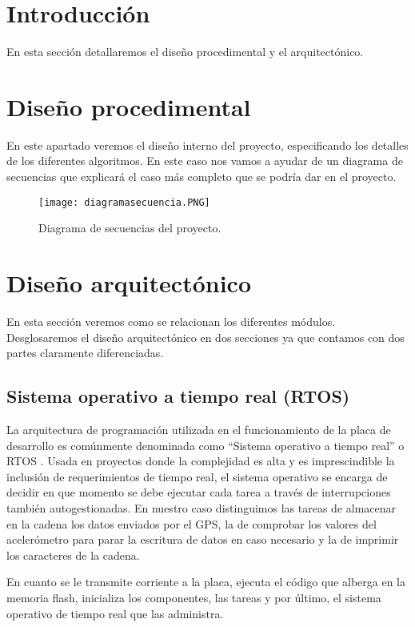 
\section{Introducción}
En esta sección detallaremos el diseño procedimental y el arquitectónico.

\section{Diseño procedimental}
En este apartado veremos el diseño interno del proyecto, especificando los detalles de los diferentes algoritmos. En este caso nos vamos a ayudar de un diagrama de secuencias que explicará el caso más completo que se podría dar en el proyecto.
\begin{figure}[!h]
	\centering
	\texttt{[image: diagramasecuencia.PNG]}
	\caption{Diagrama de secuencias del proyecto.}\label{fig:diagramasecuencia.PNG}
\end{figure}
\FloatBarrier

\section{Diseño arquitectónico}
En esta sección veremos como se relacionan los diferentes módulos. Desglosaremos el diseño arquitectónico en dos secciones ya que contamos con dos partes claramente diferenciadas.

\subsection{Sistema operativo a tiempo real (RTOS)}
La arquitectura de programación utilizada en el funcionamiento de la placa de desarrollo es comúnmente denominada como ``Sistema operativo a tiempo real'' o RTOS \cite{arquitectura}. Usada en proyectos donde la complejidad es alta y es imprescindible la inclusión de requerimientos de tiempo real, el sistema operativo se encarga de decidir en que momento se debe ejecutar cada tarea a través de interrupciones también autogestionadas. En nuestro caso distinguimos las tareas de almacenar en la cadena los datos enviados por el GPS, la de comprobar los valores del acelerómetro para parar la escritura de datos en caso necesario y la de imprimir los caracteres de la cadena. 

En cuanto se le transmite corriente a la placa, ejecuta el código que alberga en la memoria flash, inicializa los componentes, las tareas y por último, el sistema operativo de tiempo real que las administra.

